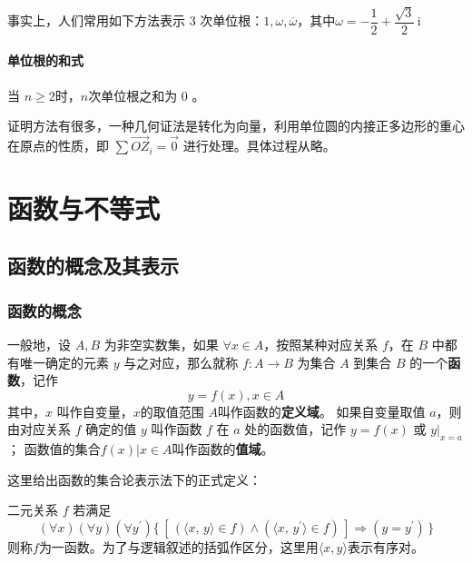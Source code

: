 \documentclass[a4paper,openany]{ctexbook}
\renewcommand{\vec}{\overrightarrow}
\newcommand{\ii}{\,\mathrm{i}}
\begin{document}
事实上，人们常用如下方法表示 \(3\) 次单位根：\(1,\omega,\overline{\omega}\)，其中\(\omega=-\dfrac{1}{2}+\dfrac{\sqrt{3}}{2}\ii\)

\subsubsection{单位根的和式}

当 \(n \ge 2\)时，\(n\)次单位根之和为 \(0\) 。

证明方法有很多，一种几何证法是转化为向量，利用单位圆的内接正多边形的重心在原点的性质，即 \(\sum \vec{OZ}_i=\vec{0}\) 进行处理。具体过程从略。

\chapter{函数与不等式}

\section{函数的概念及其表示}

\subsection{函数的概念}

一般地，设 \(A,B\) 为非空实数集，如果 \(\forall x \in A\)，按照某种对应关系 \(f\)，在 \(B\) 中都有唯一确定的元素 \(y\) 与之对应，那么就称 \(f:A\rightarrow B\)
为集合 \(A\) 到集合 \(B\) 的一个\textbf{函数}，记作\[y=f(x),x\in A\]
其中，\(x\) 叫作自变量，\(x\)的取值范围 \(A\)叫作函数的\textbf{定义域}。
如果自变量取值 \(a\)，则由对应关系 \(f\) 确定的值 \(y\) 叫作函数 \(f\) 在 \(a\) 处的函数值，记作 \(y=f(x)\) 或 \(y |_{x=a}\)；
函数值的集合\({f(x)|x\in A}\)叫作函数的\textbf{值域}。

这里给出函数的集合论表示法下的正式定义：

二元关系 \(f\) 若满足
\[
    (\forall x)(\forall y)(\forall y^{\prime})
    \{\,
    [\,(\langle x,\,y \rangle \in f)
            \wedge
            (\langle x,\,y^{\prime}\rangle \in f)\,]
    \Rightarrow (y=y^{\prime})
    \,\}
\]
则称\(f\)为一函数。为了与逻辑叙述的括弧作区分，这里用\(\langle x,y \rangle\)表示有序对。
\end{document}
